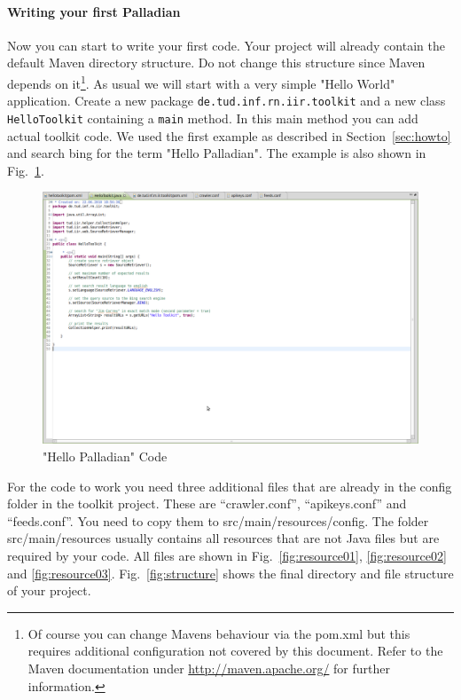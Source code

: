 \documentclass[a4paper,twoside]{book}      %
\begin{document}
\paragraph{Writing your first Palladian} Now you can start to write your first code. Your project will already contain the default Maven directory structure. Do not change this structure since Maven depends on it\footnote{Of course you can change Mavens behaviour via the pom.xml but this requires additional configuration not covered by this document. Refer to the Maven documentation under \url{http://maven.apache.org/} for further information.}. As usual we will start with a very simple "Hello World" application. Create a new package \texttt{de.tud.inf.rn.iir.toolkit} and a new class \texttt{HelloToolkit} containing a \texttt{main} method. In this main method you can add actual toolkit code. We used the first example as described in Section~\ref{sec:howto} and search bing for the term "Hello Palladian". The example is also shown in Fig.~\ref{fig:hellotoolkit}.
\begin{figure}
\centering
\includegraphics[width=\textwidth]{img/ht10.png}
\caption{"Hello Palladian" Code}
\label{fig:hellotoolkit}
\end{figure}
For the code to work you need three additional files that are already in the config folder in the toolkit project. These are ``crawler.conf'', ``apikeys.conf'' and ``feeds.conf''. You need to copy them to src/main/resources/config. The folder src/main/resources usually contains all resources that are not Java files but are required by your code. All files are shown in Fig.~\ref{fig:resource01}, \ref{fig:resource02} and \ref{fig:resource03}. Fig.~\ref{fig:structure} shows the final directory and file structure of your project.
\end{document}
